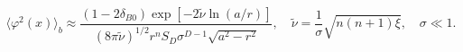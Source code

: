 \begin{equation}\label{phi2sigll1}
\langle \varphi ^{2}(x)\rangle _{b}\approx \frac{(1-2\delta
_{B0})\exp \left[-2\tilde \nu \ln (a/r)\right]}{(8\pi \tilde \nu
)^{1/2}r^{n}S_D\sigma ^{D-1}\sqrt{a^2-r^2}},\quad \tilde \nu
=\frac{1}{\sigma }\sqrt{n(n+1)\xi },\quad \sigma \ll 1.
\end{equation}

